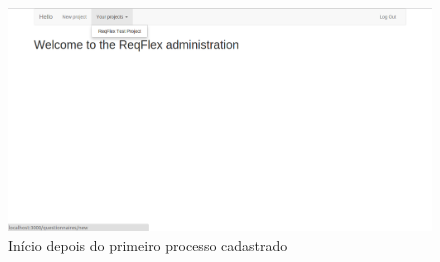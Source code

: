 \begin{figure}[H]
	\centering
	\includegraphics[scale=0.3]{imgFerramenta/primeiraPaginaDepois}
	\caption{Início depois do primeiro processo cadastrado}
	\label{img:primeira_pag_dps}
\end{figure}
